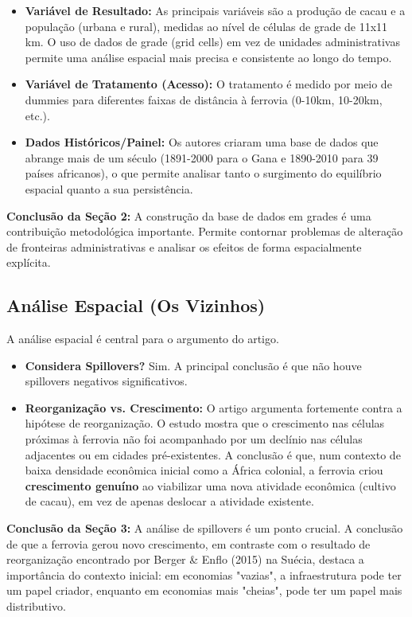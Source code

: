 \documentclass[12pt, a4paper]{article}
\begin{document}
\begin{itemize}
    \item \textbf{Variável de Resultado:} As principais variáveis são a produção de cacau e a população (urbana e rural), medidas ao nível de células de grade de 11x11 km. O uso de dados de grade (grid cells) em vez de unidades administrativas permite uma análise espacial mais precisa e consistente ao longo do tempo.
    \item \textbf{Variável de Tratamento (Acesso):} O tratamento é medido por meio de dummies para diferentes faixas de distância à ferrovia (0-10km, 10-20km, etc.).
    \item \textbf{Dados Históricos/Painel:} Os autores criaram uma base de dados que abrange mais de um século (1891-2000 para o Gana e 1890-2010 para 39 países africanos), o que permite analisar tanto o surgimento do equilíbrio espacial quanto a sua persistência.
\end{itemize}

\noindent\textbf{Conclusão da Seção 2:} A construção da base de dados em grades é uma contribuição metodológica importante. Permite contornar problemas de alteração de fronteiras administrativas e analisar os efeitos de forma espacialmente explícita.

\subsection{Análise Espacial (Os Vizinhos)}
A análise espacial é central para o argumento do artigo.
\begin{itemize}
    \item \textbf{Considera Spillovers?} Sim. A principal conclusão é que não houve spillovers negativos significativos.
    \item \textbf{Reorganização vs. Crescimento:} O artigo argumenta fortemente contra a hipótese de reorganização. O estudo mostra que o crescimento nas células próximas à ferrovia não foi acompanhado por um declínio nas células adjacentes ou em cidades pré-existentes. A conclusão é que, num contexto de baixa densidade econômica inicial como a África colonial, a ferrovia criou \textbf{crescimento genuíno} ao viabilizar uma nova atividade econômica (cultivo de cacau), em vez de apenas deslocar a atividade existente.
\end{itemize}

\noindent\textbf{Conclusão da Seção 3:} A análise de spillovers é um ponto crucial. A conclusão de que a ferrovia gerou novo crescimento, em contraste com o resultado de reorganização encontrado por Berger \& Enflo (2015) na Suécia, destaca a importância do contexto inicial: em economias "vazias", a infraestrutura pode ter um papel criador, enquanto em economias mais "cheias", pode ter um papel mais distributivo.
\end{document}
